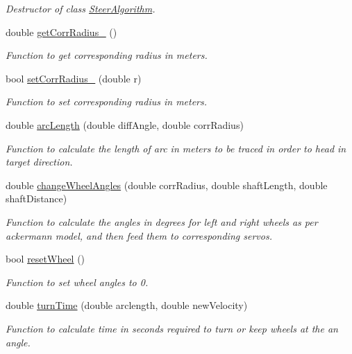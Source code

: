 \begin{DoxyCompactItemize}
\begin{DoxyCompactList}\small\item\em Destructor of class \hyperlink{class_steer_algorithm}{Steer\+Algorithm}. \end{DoxyCompactList}\item 
double \hyperlink{class_steer_algorithm_a06a7dd049280fab40d1b54c912daf399}{get\+Corr\+Radius\+\_\+} ()
\begin{DoxyCompactList}\small\item\em Function to get corresponding radius in meters. \end{DoxyCompactList}\item 
bool \hyperlink{class_steer_algorithm_a93cf1fc7d06376ddeaa4e81f2b0a22cc}{set\+Corr\+Radius\+\_\+} (double r)
\begin{DoxyCompactList}\small\item\em Function to set corresponding radius in meters. \end{DoxyCompactList}\item 
double \hyperlink{class_steer_algorithm_a17ff78af17e900f752237d274bcf751d}{arc\+Length} (double diff\+Angle, double corr\+Radius)
\begin{DoxyCompactList}\small\item\em Function to calculate the length of arc in meters to be traced in order to head in target direction. \end{DoxyCompactList}\item 
double \hyperlink{class_steer_algorithm_a6067af69593713f561890ae8ad23f5ff}{change\+Wheel\+Angles} (double corr\+Radius, double shaft\+Length, double shaft\+Distance)
\begin{DoxyCompactList}\small\item\em Function to calculate the angles in degrees for left and right wheels as per ackermann model, and then feed them to corresponding servos. \end{DoxyCompactList}\item 
bool \hyperlink{class_steer_algorithm_ab251b6fd1f88fb7a526b0d55cd12625b}{reset\+Wheel} ()
\begin{DoxyCompactList}\small\item\em Function to set wheel angles to 0. \end{DoxyCompactList}\item 
double \hyperlink{class_steer_algorithm_aefdb433f65c47bf6e0d6af5de98c8f5a}{turn\+Time} (double arclength, double new\+Velocity)
\begin{DoxyCompactList}\small\item\em Function to calculate time in seconds required to turn or keep wheels at the an angle. \end{DoxyCompactList}\end{DoxyCompactItemize}

